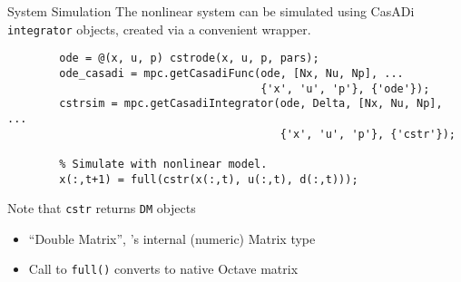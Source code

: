 \documentclass[xcolor=dvipsnames,handout]{beamer}
\begin{document}
\begin{frame}[fragile]{System Simulation}
    The nonlinear system can be simulated using CasADi \texttt{integrator} objects, created via a convenient wrapper.
        
    \begin{lstlisting}[gobble=8]
        % Turn into casadi function and simulator.
        ode = @(x, u, p) cstrode(x, u, p, pars);
        ode_casadi = mpc.getCasadiFunc(ode, [Nx, Nu, Np], ...
                                       {'x', 'u', 'p'}, {'ode'});
        cstrsim = mpc.getCasadiIntegrator(ode, Delta, [Nx, Nu, Np], ...
                                          {'x', 'u', 'p'}, {'cstr'});
        
        % Simulate with nonlinear model.
        x(:,t+1) = full(cstr(x(:,t), u(:,t), d(:,t)));
    \end{lstlisting} \pause
    
    \bigskip
    
    Note that \lstinline!cstr! returns \casadi{} \lstinline!DM! objects
    \begin{itemize}
        \item ``Double Matrix'', \casadi's internal (numeric) Matrix type
        \item Call to \lstinline!full()! converts to native Octave matrix
    \end{itemize}
\end{frame}
\end{document}
